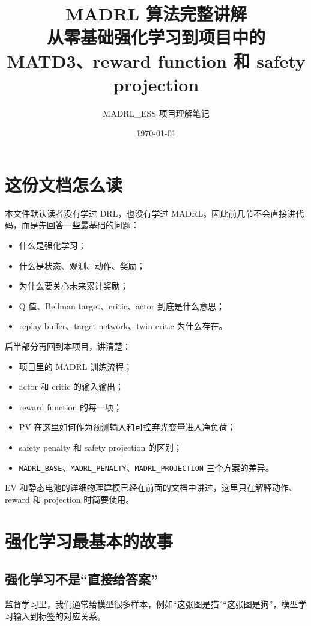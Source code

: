 \documentclass[UTF8,zihao=-4]{ctexart}
\title{MADRL 算法完整讲解\\{\large 从零基础强化学习到项目中的 MATD3、reward function 和 safety projection}}
\author{MADRL\_ESS 项目理解笔记}
\date{\today}
\begin{document}
\maketitle
\tableofcontents
\newpage

\section{这份文档怎么读}

本文件默认读者没有学过 DRL，也没有学过 MADRL。因此前几节不会直接讲代码，而是先回答一些最基础的问题：
\begin{itemize}
  \item 什么是强化学习；
  \item 什么是状态、观测、动作、奖励；
  \item 为什么要关心未来累计奖励；
  \item Q 值、Bellman target、critic、actor 到底是什么意思；
  \item replay buffer、target network、twin critic 为什么存在。
\end{itemize}

后半部分再回到本项目，讲清楚：
\begin{itemize}
  \item 项目里的 MADRL 训练流程；
  \item actor 和 critic 的输入输出；
  \item reward function 的每一项；
  \item PV 在这里如何作为预测输入和可控弃光变量进入净负荷；
  \item safety penalty 和 safety projection 的区别；
  \item \texttt{MADRL\_BASE}、\texttt{MADRL\_PENALTY}、\texttt{MADRL\_PROJECTION} 三个方案的差异。
\end{itemize}

EV 和静态电池的详细物理建模已经在前面的文档中讲过，这里只在解释动作、reward 和 projection 时简要使用。

\section{强化学习最基本的故事}

\subsection{强化学习不是“直接给答案”}

监督学习里，我们通常给模型很多样本，例如“这张图是猫”“这张图是狗”，模型学习输入到标签的对应关系。
\end{document}
